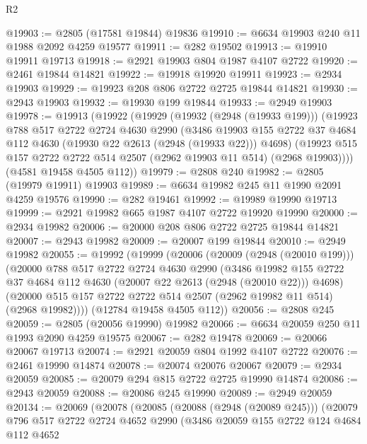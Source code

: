 \begin{lexlean}{R2}
\begin{coremodule}
@19903 := @2805 (@17581 @19844) @19836
@19910 := @6634 @19903 @240 @11 @1988 @2092 @4259 @19577
@19911 := @282 @19502
@19913 := @19910 @19911 @19713
@19918 := @2921 @19903 @804 @1987 @4107 @2722
@19920 := @2461 @19844 @14821
@19922 := @19918 @19920 @19911
@19923 := @2934 @19903
@19929 := @19923 @208 @806 @2722 @2725 @19844 @14821
@19930 := @2943 @19903
@19932 := @19930 @199 @19844
@19933 := @2949 @19903
@19978 := @19913
    (@19922
      (@19929
        (@19932 (@2948 (@19933 @199)))
        (@19923
          @788
          @517
          @2722
          @2724
          @4630
          @2990
          (@3486
            @19903
            @155
            @2722
            @37
            @4684
            @112
            @4630
            (@19930 @22 @2613 (@2948 (@19933 @22)))
            @4698)
          (@19923 @515 @157 @2722 @2722 @514 @2507 (@2962 @19903 @11 @514) (@2968 @19903))))
      (@4581 @19458 @4505 @112))
@19979 := @2808 @240
@19982 := @2805 (@19979 @19911) @19903
@19989 := @6634 @19982 @245 @11 @1990 @2091 @4259 @19576
@19990 := @282 @19461
@19992 := @19989 @19990 @19713
@19999 := @2921 @19982 @665 @1987 @4107 @2722 @19920 @19990
@20000 := @2934 @19982
@20006 := @20000 @208 @806 @2722 @2725 @19844 @14821
@20007 := @2943 @19982
@20009 := @20007 @199 @19844
@20010 := @2949 @19982
@20055 := @19992
    (@19999
      (@20006
        (@20009 (@2948 (@20010 @199)))
        (@20000
          @788
          @517
          @2722
          @2724
          @4630
          @2990
          (@3486
            @19982
            @155
            @2722
            @37
            @4684
            @112
            @4630
            (@20007 @22 @2613 (@2948 (@20010 @22)))
            @4698)
          (@20000 @515 @157 @2722 @2722 @514 @2507 (@2962 @19982 @11 @514) (@2968 @19982))))
      (@12784 @19458 @4505 @112))
@20056 := @2808 @245
@20059 := @2805 (@20056 @19990) @19982
@20066 := @6634 @20059 @250 @11 @1993 @2090 @4259 @19575
@20067 := @282 @19478
@20069 := @20066 @20067 @19713
@20074 := @2921 @20059 @804 @1992 @4107 @2722
@20076 := @2461 @19990 @14874
@20078 := @20074 @20076 @20067
@20079 := @2934 @20059
@20085 := @20079 @294 @815 @2722 @2725 @19990 @14874
@20086 := @2943 @20059
@20088 := @20086 @245 @19990
@20089 := @2949 @20059
@20134 := @20069
    (@20078
      (@20085
        (@20088 (@2948 (@20089 @245)))
        (@20079
          @796
          @517
          @2722
          @2724
          @4652
          @2990
          (@3486
            @20059
            @155
            @2722
            @124
            @4684
            @112
            @4652

\end{coremodule}
\end{lexlean}

